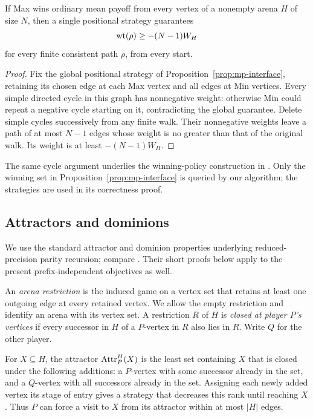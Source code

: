 \begin{lemma}\label{lem:mp-prefix}
If Max wins ordinary mean payoff from every vertex of a nonempty
arena $H$ of size $N$, then a single positional strategy guarantees
\[
                  \operatorname{wt}(\rho)\ge -(N-1)W_H
\]
for every finite consistent path $\rho$, from every start.
\end{lemma}

\begin{proof}
Fix the global positional strategy of
Proposition~\ref{prop:mp-interface}, retaining its chosen edge at
each Max vertex and all edges at Min vertices. Every simple directed
cycle in this graph has nonnegative weight: otherwise Min could
repeat a negative cycle starting on it, contradicting the global
guarantee. Delete simple cycles successively from any finite walk.
Their nonnegative weights leave a path of at most $N-1$ edges whose
weight is no greater than that of the original walk. Its weight is
at least $-(N-1)W_H$.
\end{proof}

The same cycle argument underlies the winning-policy construction in
\cite[Proposition~2.2]{OpenAI2026Deterministic}.
Only the winning set in Proposition~\ref{prop:mp-interface} is
queried by our algorithm; the strategies are used in its correctness
proof.

\subsection{Attractors and dominions}

We use the standard attractor and dominion properties underlying
reduced-precision parity recursion; compare
\cite[Lemmas~2.1--2.2]{LehtinenParysScheweWojtczak2022}.
Their short proofs below apply to the present prefix-independent
objectives as well.

An \emph{arena restriction} is the induced game on a vertex set that
retains at least one outgoing edge at every retained vertex. We allow
the empty restriction and identify an arena with its vertex set.
A restriction $R$ of $H$ is \emph{closed at player $P$'s vertices}
if every successor in $H$ of a $P$-vertex in $R$ also lies in $R$.
Write $Q$ for the other player.

For $X\subseteq H$, the attractor $\operatorname{Attr}_P^H(X)$ is the least set
containing $X$ that is closed under the following additions: a
$P$-vertex with some successor already in the set, and a $Q$-vertex
with all successors already in the set. Assigning each newly added
vertex its stage of entry gives a strategy that decreases this rank
until reaching $X$. Thus $P$ can force a visit to $X$ from its
attractor within at most $|H|$ edges.

